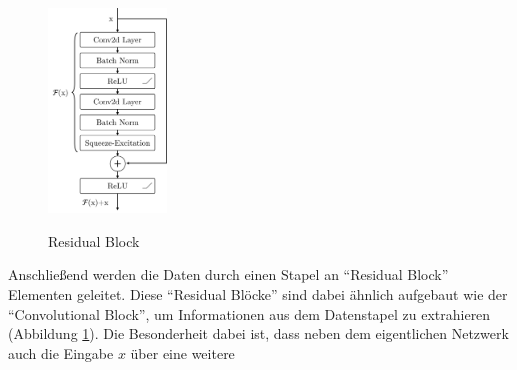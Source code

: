 \begin{figure}
    \vspace*{-0.375cm}
    \centering
    \includegraphics[width=0.28\textwidth]{res/pictures/res-block.pdf}
    \vspace*{-5pt}
    \caption[Residual Block]{\unskip}
    Residual Block
    \label{fig:resblock}
    \vspace*{-4cm}
\end{figure}

Anschließend werden die Daten durch einen Stapel an \enquote{Residual Block} Elementen geleitet. Diese \enquote{Residual Blöcke} sind dabei ähnlich aufgebaut wie der \enquote{Convolutional Block}, um Informationen aus dem Datenstapel zu extrahieren (Abbildung \ref{fig:resblock}). Die Besonderheit dabei ist, dass neben dem eigentlichen Netzwerk auch die Eingabe $x$ über eine weitere

